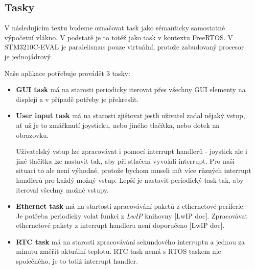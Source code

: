 \subsection{Tasky}

V následujícím textu budeme označovat task jako sémanticky samostatné výpočetní
vlákno.
V podstatě je to totéž jako task v kontextu FreeRTOS.
V STM3210C-EVAL je paralelismus pouze virtuální, protože zabudovaný procesor je
jednojádrový.

Naše aplikace potřebuje provádět 3 tasky:
\begin{itemize}
    \item \textbf{GUI task} má na starosti periodicky iterovat přes všechny GUI elementy
        na displeji a v případě potřeby je překreslit.

    \item \textbf{User input task} má na starosti zjišťovat jestli uživatel zadal nějaký
        vstup, ať už je to zmáčknutí joysticku, nebo jiného tlačítka, nebo dotek
        na obrazovku.

        Uživatelský vstup lze zpracovávat i pomocí interrupt handlerů - joystick
        ale i jiné tlačítka lze nastavit tak, aby při stlačení vyvolali interrupt.
        Pro naši situaci to ale není výhodné, protože bychom museli mít více různých
        interrupt handlerů pro každý možný vstup.
        Lepší je nastavit periodický task tak, aby iteroval všechny možné vstupy. 

    \item \textbf{Ethernet task} má na startosti zpracovávání paketů z ethernetové
        periferie. Je potřeba periodicky volat funkci z \textit{LwIP} knihovny [LwIP doc].
        Zpracovávat ethernetové pakety z interrupt handleru není doporučeno [LwIP doc].

    \item \textbf{RTC task} má na starosti zpracovávání sekundového interruptu a jednou za
        minutu změřit aktuální teplotu. RTC task nemá s RTOS taskem nic společného, je
        to totiž interrupt handler.
\end{itemize}

